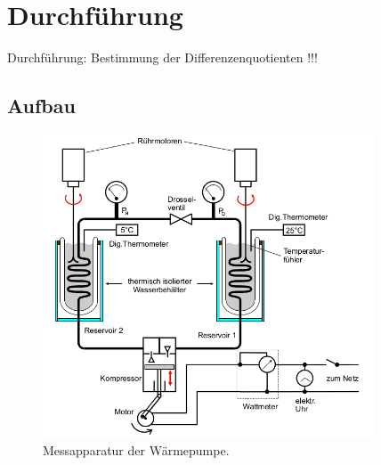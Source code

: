  \section{Durchführung}
\label{sec:Durchführung}
Durchführung: Bestimmung der Differenzenquotienten !!!

\subsection{Aufbau}



\begin{figure}
  \centering
  \includegraphics[height=9cm]{WaermepumpeAufbau.png}
  \caption{Messapparatur der Wärmepumpe.}
  \label{fig:WaermepumpeAufbau}
\end{figure}
